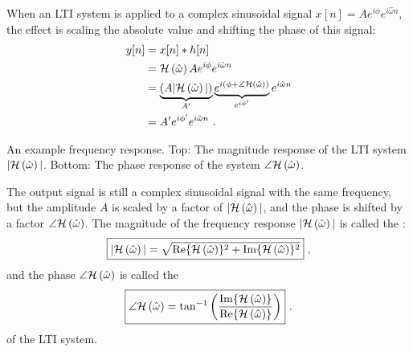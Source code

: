 When an LTI system is applied to a complex sinusoidal signal $x[n]=A
e^{i\phi}e^{i\hat{\omega}n}$, the effect is scaling the absolute value and
shifting the phase of this signal:
\begin{align}
y[n] &= x[n]*h[n]\\
     &= \mathcal{H}\left(\hat{\omega}\right) A e^{i\phi}e^{i\hat{\omega}n} \\
     &= \underbrace{(A|\mathcal{H}\left(\hat{\omega}\right)|)}_{A'}\underbrace{e^{i(\phi + \angle \mathcal{H}\left(\hat{\omega}\right))}}_{e^{i\phi'}} e^{i\hat{\omega} n}\\
     &= A' e^{i\phi'} e^{i\hat{\omega} n} \,\,.
\end{align}
\begin{marginfigure}
\begin{center}
\end{center}
\caption{An example frequency response. Top: The magnitude response of the LTI system $|\mathcal{H}\left(\hat{\omega}\right)|$. Bottom: The phase response of the system $\angle \mathcal{H}\left(\hat{\omega}\right)$.}
\label{fig:he_example_lpf}
\end{marginfigure}

The output signal is still a complex sinusoidal signal with the same
frequency, but the amplitude $A$ is scaled by a factor of $|\mathcal{H}\left(\hat{\omega}\right)|$, and the
phase is shifted by a factor $\angle \mathcal{H}\left(\hat{\omega}\right)$. The magnitude of the
frequency response $|\mathcal{H}\left(\hat{\omega}\right)|$ is called the \emph{}:
\begin{equation}
\boxed{
|\mathcal{H}\left(\hat{\omega}\right)|=\sqrt{\Re\{\mathcal{H}\left(\hat{\omega}\right)\}^2+\Im\{\mathcal{H}\left(\hat{\omega}\right)\}^2}
} \,\,,
\end{equation}
and the phase $\angle \mathcal{H}\left(\hat{\omega}\right)$ is called
the \emph{}
\begin{equation}
\boxed{
\angle \mathcal{H}\left(\hat{\omega}\right) = \tan^{-1}\left(\frac{\Im\{\mathcal{H}\left(\hat{\omega}\right)\}}{\Re\{\mathcal{H}\left(\hat{\omega}\right)\}}\right)
} \,\,.
\end{equation}
of the LTI system. 

